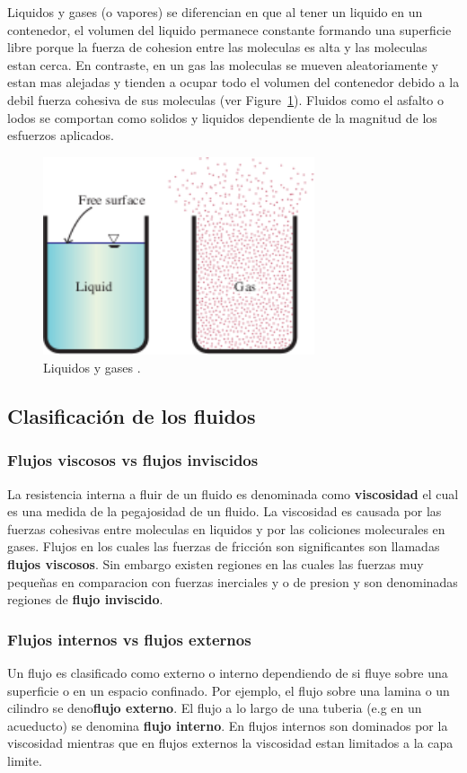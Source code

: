 \documentclass[10pt, oneside]{article}
\begin{document}
Liquidos y gases (o vapores) se diferencian en que al tener un liquido en un contenedor, el volumen del liquido permanece constante formando una superficie libre porque la fuerza de cohesion entre las moleculas es alta y las moleculas estan cerca. En contraste, en un gas las moleculas se mueven aleatoriamente y estan mas alejadas y tienden a ocupar todo el volumen del contenedor debido a la debil fuerza cohesiva de sus moleculas (ver Figure~\ref{f2}). Fluidos como el asfalto o lodos se comportan como solidos y liquidos dependiente de la magnitud de los esfuerzos aplicados. 

\begin{figure}[h]
\centering
\includegraphics[width=8cm]{liqGas}
\caption{Liquidos y gases \cite{this}.}
\label{f2}
\end{figure}


\subsection{Clasificaci\'on de los fluidos}
\subsubsection{Flujos viscosos vs flujos inviscidos} 
La resistencia interna a fluir de un fluido es denominada como \textbf{viscosidad} el cual es una medida de la pegajosidad de un fluido. La viscosidad es causada por las fuerzas cohesivas entre moleculas en liquidos y por las coliciones molecurales en gases. Flujos en los cuales las fuerzas de fricci\'on son significantes son llamadas \textbf{flujos viscosos}. Sin embargo existen regiones en las cuales las fuerzas muy peque\~nas en comparacion con fuerzas inerciales y o de presion y son denominadas regiones de \textbf{flujo inviscido}.

\subsubsection{Flujos internos vs flujos externos} 
Un flujo es clasificado como externo o interno dependiendo de si fluye sobre una superficie o en un espacio confinado. Por ejemplo, el flujo sobre una lamina o un cilindro se deno\textbf{flujo externo}. El flujo a lo largo de una tuberia (e.g en un acueducto) se denomina \textbf{flujo interno}. En flujos internos son dominados por la viscosidad mientras que en flujos externos la viscosidad estan limitados a la capa limite.
\end{document}

